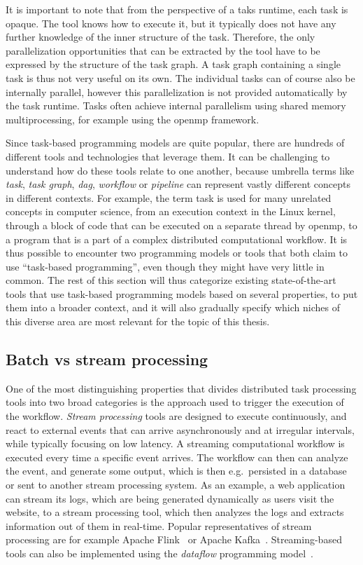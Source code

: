 It is important to note that from the perspective of a taks runtime, each task is opaque. The tool
knows how to execute it, but it typically does not have any further knowledge of the inner
structure of the task. Therefore, the only parallelization opportunities that can be extracted by
the tool have to be expressed by the structure of the task graph. A task graph containing a single
task is thus not very useful on its own. The individual tasks can of course also be internally
parallel, however this parallelization is not provided automatically by the task runtime. Tasks
often achieve internal parallelism using shared memory multiprocessing, for example using the
\gls{openmp} framework.

Since task-based programming models are quite popular, there are hundreds of different tools and
technologies that leverage them. It can be challenging to understand how do these tools relate to
one another, because umbrella terms like \emph{task}, \emph{task graph},
\emph{\gls{dag}}, \emph{workflow} or \emph{pipeline} can represent vastly
different concepts in different contexts. For example, the term task is used for many unrelated
concepts in computer science, from an execution context in the Linux kernel, through a block of
code that can be executed on a separate thread by \gls{openmp}, to a program that is a
part of a complex distributed computational workflow. It is thus possible to encounter two
programming models or tools that both claim to use ``task-based programming'', even though they
might have very little in common. The rest of this section will thus categorize existing
state-of-the-art tools that use task-based programming models based on several properties, to put
them into a broader context, and it will also gradually specify which niches of this diverse area
are most relevant for the topic of this thesis.

\subsection{Batch vs stream processing}
One of the most distinguishing properties that divides distributed task processing tools into two
broad categories is the approach used to trigger the execution of the workflow.
\emph{Stream processing} tools are designed to execute continuously, and react to external events
that can arrive asynchronously and at irregular intervals, while typically focusing on low latency.
A streaming computational workflow is executed every time a specific event arrives. The workflow
can then can analyze the event, and generate some output, which is then e.g.\ persisted in a
database or sent to another stream processing system. As an example, a web application can stream
its logs, which are being generated dynamically as users visit the website, to a stream processing
tool, which then analyzes the logs and extracts information out of them in real-time. Popular
representatives of stream processing are for example Apache Flink~\cite{flink} or Apache
Kafka~\cite{kafka}. Streaming-based tools can also be implemented using the
\emph{dataflow} programming model~\cite{dataflow,timely_dataflow}.

